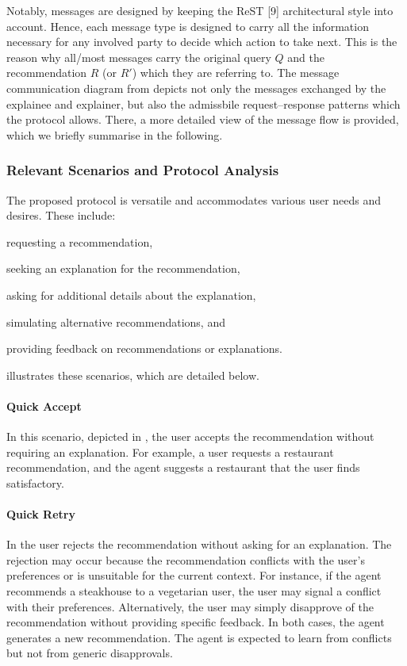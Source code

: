 Notably, messages are designed by keeping the \gls{ReST} [9] architectural style into account.
%
Hence, each message type is designed to carry all the information necessary for any involved party to decide which action to take next.
%
This is the reason why all/most messages carry the original query $Q$ and the recommendation $R$ (or $R'$) which they are referring to.
%
The message communication diagram from  depicts not only the messages exchanged by the explainee and explainer, but also the admissbile request–response patterns which the protocol allows.
%
There, a more detailed view of the message flow is provided, which we briefly summarise in the following.


\subsubsection{Relevant Scenarios and Protocol Analysis}\label{subsubsec:relevant-scenarios}
%

%
The proposed protocol is versatile and accommodates various user needs and desires.
%
These include:
%
\begin{inlinelist}
    \item requesting a recommendation,
    \item seeking an explanation for the recommendation,
    \item asking for additional details about the explanation,
    \item simulating alternative recommendations, and
    \item providing feedback on recommendations or explanations.
\end{inlinelist}
%
 illustrates these scenarios, which are detailed below.

%
\paragraph{Quick Accept}
%
In this scenario, depicted in , the user accepts the recommendation without requiring an explanation.
%
For example, a user requests a restaurant recommendation, and the agent suggests a restaurant that the user finds satisfactory.

%
\paragraph{Quick Retry}
%
In  the user rejects the recommendation without asking for an explanation.
%
The rejection may occur because the recommendation conflicts with the user's preferences or is unsuitable for the current context.
%
For instance, if the agent recommends a steakhouse to a vegetarian user, the user may signal a conflict with their preferences.
%
Alternatively, the user may simply disapprove of the recommendation without providing specific feedback.
%
In both cases, the agent generates a new recommendation.
%
The agent is expected to learn from conflicts but not from generic disapprovals.

